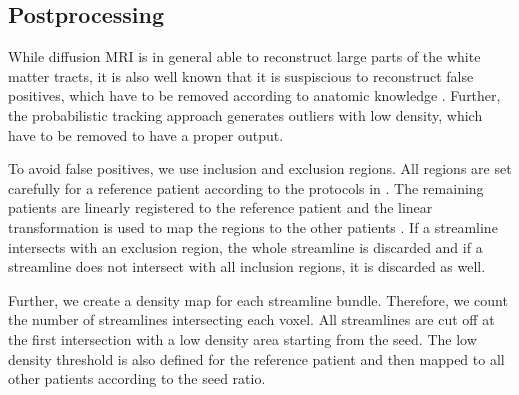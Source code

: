 \subsection{Postprocessing}
While diffusion MRI is in general able to reconstruct large parts of the white
matter tracts, it is also well known that it is suspiscious to reconstruct false
positives, which have to be removed according to anatomic knowledge
\cite{Wakana:2007, MaierHein:2017}. Further, the probabilistic tracking approach
generates outliers with low density, which have to be removed to have a proper
output. 

To avoid false positives, we use inclusion and exclusion regions. All regions
are set carefully for a reference patient according to the protocols in
\cite{MaierHein:2017}.
The remaining patients are linearly registered to the reference patient and the
linear transformation is used to map the regions to the other patients
\cite{FSL}.
If a streamline intersects with an exclusion region, the whole streamline is
discarded and if a streamline does not intersect with all inclusion regions, it
is discarded as well. 

Further, we create a density map for each streamline
bundle. Therefore, we count the number of streamlines intersecting each voxel.
All streamlines are cut off at the first intersection with a low density
area starting from the seed. The low density threshold is also defined for the
reference patient and then mapped to all other patients according to the seed
ratio.
